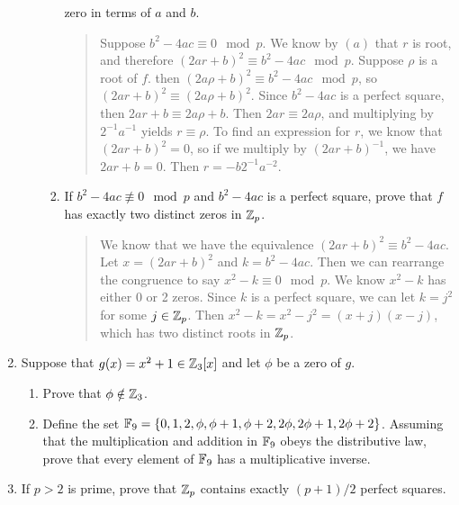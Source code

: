 \documentclass{hw}
\begin{document}
\begin{enumerate}
\begin{enumerate}
\begin{enumerate}
zero in terms of $a$ and $b$.
\begin{quote}
Suppose $b^{2}-4ac\equiv0\mod p$. We know by $(a)$ that $r$ is root, and therefore
$(2ar+b)^2\equiv b^2-4ac \mod p$. Suppose $\rho$ is a root of $f$. then
$(2a\rho+b)^2\equiv b^2-4ac \mod p$, so $(2ar+b)^2\equiv(2a\rho+b)^2$. Since $b^2-4ac$ is a perfect
square, then $2ar+b\equiv2a\rho+b$. Then $2ar\equiv2a\rho$, and multiplying by $2^{-1}a^{-1}$ yields
$r\equiv\rho$. To find an expression for $r$, we know that $(2ar+b)^2=0$, so if we multiply by
$(2ar+b)^{-1}$, we have $2ar+b=0$. Then $r=-b2^{-1}a^{-2}$.
\end{quote}
\item If $b^{2}-4ac\nequiv0\mod p$ and $b^{2}-4ac$ is a perfect square, prove that $f$ has exactly
two distinct zeros in $\mathbb{Z}_{p}$.
\begin{quote}
We know that we have the equivalence $(2ar+b)^2\equiv b^2-4ac$. Let $x=(2ar+b)^2$ and
$k=b^2-4ac$. Then we can rearrange the congruence to say $x^2-k\equiv0\mod p$. We know
$x^2-k$ has either 0 or 2 zeros. Since $k$ is a perfect square, we can let $k=j^2$ for some
$j\in\mathbb{Z}_{p}$. Then $x^2-k=x^2-j^2=(x+j)(x-j)$, which has two distinct roots in $\mathbb{Z}_{p}$.
\end{quote}
\end{enumerate}
\end{enumerate}

\item Suppose that $g(x)=x^2+1\in\mathbb{Z}_{3}[x]$ and let $\phi$ be a zero of $g$.
\begin{enumerate}
\item Prove that $\phi\notin\mathbb{Z}_{3}$.
\begin{quote}

\end{quote}
\item Define the set $\mathbb{F}_{9}=\{ 0,1,2,\phi,\phi+1,\phi+2,2\phi,2\phi+1,2\phi+2 \}$. Assuming that
the multiplication and addition in $\mathbb{F}_{9}$ obeys the distributive law, prove that every element of
$\mathbb{F}_{9}$ has a multiplicative inverse.
\begin{quote}

\end{quote}
\end{enumerate}

\item If $p>2$ is prime, prove that $\mathbb{Z}_{p}$ contains exactly $(p+1)/2$ perfect squares.
\begin{quote}

\end{quote}
\end{enumerate}
\end{document}
